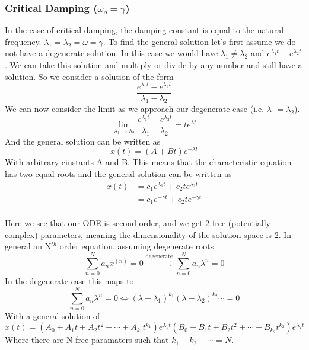 \documentclass{article}
\newcommand{\be}{\begin{equation}}
\newcommand{\ee}{\end{equation}}
\begin{document}
\subsubsection*{Critical Damping ($\omega_o = \gamma$)}
In the case of critical damping, the damping constant is equal to the natural frequency.
$\lambda_1 = \lambda_2 = \omega = \gamma$. 
To find the general solution let's first assume we do not have a degenerate solution.
In this case we would have $\lambda_1 \neq \lambda_2$ and $e^{\lambda_1 t} - e^{\lambda_2 t}$. 
We can take this solution and multiply or divide by any number and still have a solution. 
So we consider a solution of the form
\be
\frac{e^{\lambda_1 t} - e^{\lambda_2 t}}{\lambda_1-\lambda_2}
\ee
We can now consider the limit as we approach our degenerate case (i.e. $\lambda_1=\lambda_2$). 
\be
\lim_{\lambda_1\to\lambda_2}  \frac{e^{\lambda_1 t} - e^{\lambda_2 t}}{\lambda_1-\lambda_2} = te^{\lambda t}
\ee
And the general solution can be written as 
\be
x(t) = (A + Bt)e^{-\lambda t}
\ee
With arbitrary cinstants A and B. 
This means that the characteristic equation has two equal roots and the general solution can be written as
\be
\begin{split}
x(t) &= c_1 e^{\lambda_1 t} + c_2 te^{\lambda_2 t}\\
&= c_1 e^{-\gamma t} + c_2 te^{-\gamma t}\\
\end{split}
\ee

Here we see that our ODE is second order, and we get 2 free (potentially complex) parameters, meaning the dimensionality of the solution space is 2. 
In general an N$^{th}$ order equation, assuming degenerate roots
\be
\sum_{n=0}^N a_n x^{(n)} = 0 \xrightarrow{\text{degenerate}} \sum_{n=0}^N a_n \lambda^n = 0
\ee
In the degenerate case this maps to
\be
\sum_{n=0}^N a_n \lambda^n = 0 \Leftrightarrow (\lambda - \lambda_1)^{k_1} (\lambda - \lambda_2)^{k_2} \cdots = 0
\ee
With a general solution of 
\be
x(t) = \left( A_0 + A_1t + A_2t^2 + \cdots + A_{k_1} t^{k_1}\right) e^{\lambda_1t} \left( B_0 + B_1t + B_2t^2 + \cdots + B_{k_2} t^{k_2}\right) e^{\lambda_2t}
\ee
Where there are N free paramaters such that $k_1 + k_2 + \cdots = N$. 
\end{document}
